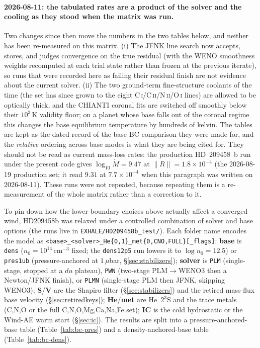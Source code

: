 \documentclass[english,a4paper]{my_memo}
\begin{document}
\paragraph{2026-08-11: the tabulated rates are a product of the solver and the
cooling as they stood when the matrix was run.} Two changes since then move the
numbers in the two tables below, and neither has been re-measured on this matrix.
(i) The JFNK line search now accepts, stores, and judges convergence on the true
residual (with the WENO smoothness weights recomputed at each trial state
rather than frozen at the previous iterate), so runs that were recorded here as
failing their residual finish are not evidence about the current solver. (ii) The
two ground-term fine-structure coolants of the time (the set has since grown to
the eight C\,\textsc{i}/C\,\textsc{ii}/N\,\textsc{ii}/O\,\textsc{i} lines) are
allowed to be optically thick, and
the CHIANTI coronal fits are switched off smoothly below their $10^3$\,K validity
floor; on a planet whose base falls out of the coronal regime this changes the base
equilibrium temperature by hundreds of kelvin. The tables are kept as the dated
record of the base-BC comparison they were made for, and the \emph{relative}
ordering across base modes is what they are being cited for. They should not be
read as current mass-loss rates: the production HD~209458~b run under the present
code gives $\log_{10}\dot M = 9.47$ at $\lVert R\rVert = 1.8\times10^{-4}$ (the
2026-08-19 production set; it read $9.31$ at $7.7\times10^{-4}$ when this
paragraph was written on 2026-08-11). These
runs were not repeated, because repeating them is a re-measurement of the whole
matrix rather than a correction to it.

To pin down how the lower-boundary choices above actually affect a converged
wind, HD209458b was relaxed under a controlled combination of solver and base
options (the runs live in \texttt{EXHALE/HD209458b\_test/}). Each folder name
encodes the model as \texttt{<base>\_<solver>\_He\{0,1\}\_met\{0,CNO,FULL\}[\_flags]}:
\textbf{base} is \texttt{dens} ($n_0 = 10^{14}\,\mathrm{cm^{-3}}$ fixed; the
\texttt{dens12p5} run lowers it to $\log n_0 = 12.5$) or \texttt{pres1ub}
(pressure-anchored at $1\,\mu$bar, \S\ref{sec:stabilizers}); \textbf{solver} is
\texttt{PLM} (single-stage, stopped at a $du$ plateau), \texttt{PWN}
(two-stage PLM$\to$WENO3 then a Newton/JFNK finish), or \texttt{PLMN}
(single-stage PLM then JFNK, skipping WENO3); \textbf{S}/\textbf{V} are
the Shapiro filter (\S\ref{sec:stabilizers}) and the retired mass-flux base
velocity (\S\ref{sec:retiredkeys});
\textbf{He}/\textbf{met} are He~$2^3$S and the trace metals (C,N,O or the full
C,N,O,Mg,Ca,Na,Fe set); \textbf{IC} is the cold hydrostatic or the Wind-AE warm
start (\S\ref{sec:ic}). The results are split into a pressure-anchored-base
table (Table~\ref{tab:bc-pres}) and a density-anchored-base table
(Table~\ref{tab:bc-dens}).
\end{document}
